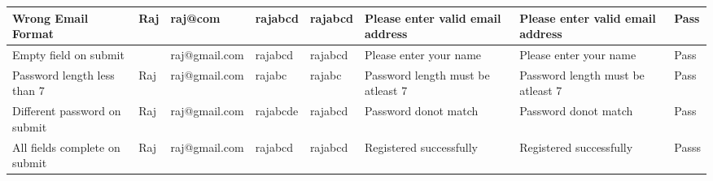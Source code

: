 \documentclass[conference]{IEEEtran}
\begin{document}
\begin{table}[]
{\begin{tabular}{|l|l|l|l|l|l|l|l|}
Wrong Email Format                                     & Raj                       & raj@com                       & rajabcd                       & rajabcd                                                                         & Please enter valid email address                                                                          & Please enter valid email address                                                                        & Pass                                                                                                  \\ \hline
Empty field on submit                                  &                           & raj@gmail.com                 & rajabcd                       & rajabcd                                                                         & Please enter your name                                                                                    & Please enter your name                                                                                  & Pass                                                                                                  \\ \hline
Password length less than 7                            & Raj                       & raj@gmail.com                 & rajabc                        & rajabc                                                                          & Password length must be atleast 7                                                                         & Password length must be atleast 7                                                                       & Pass                                                                                                  \\ \hline
Different password on submit                           & Raj                       & raj@gmail.com                 & rajabcde                      & rajabcd                                                                         & Password donot match                                                                                      & Password donot match                                                                                    & Pass                                                                                                  \\ \hline
All fields complete on submit                          & Raj                       & raj@gmail.com                 & rajabcd                       & rajabcd                                                                         & Registered successfully                                                                                   & Registered successfully                                                                                 & Passs                                                                                                 \\ \hline

\end{tabular}}
\end{table}
\end{document}
